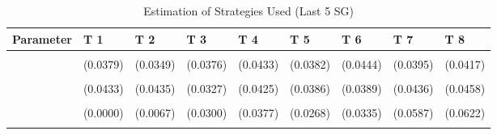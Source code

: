 \begin{table}[!h]
\centering
\caption{Estimation of Strategies Used (Last 5 SG)}
\centering
\begin{tabular}[t]{lllllllll}
\toprule
Parameter & T 1 & T 2 & T 3 & T 4 & T 5 & T 6 & T 7 & T 8\\
\midrule
\cellcolor{gray!10}{gamma} & \cellcolor{gray!10}{0.6026***} & \cellcolor{gray!10}{0.5308***} & \cellcolor{gray!10}{0.5665***} & \cellcolor{gray!10}{0.6275***} & \cellcolor{gray!10}{0.5906***} & \cellcolor{gray!10}{0.6771***} & \cellcolor{gray!10}{0.6091***} & \cellcolor{gray!10}{0.6339***}\\
 & (0.0379) & (0.0349) & (0.0376) & (0.0433) & (0.0382) & (0.0444) & (0.0395) & (0.0417)\\
\cellcolor{gray!10}{AD} & \cellcolor{gray!10}{0.4926***} & \cellcolor{gray!10}{0.3683***} & \cellcolor{gray!10}{0.8090***} & \cellcolor{gray!10}{0.6848***} & \cellcolor{gray!10}{0.7674***} & \cellcolor{gray!10}{0.7955***} & \cellcolor{gray!10}{0.3542***} & \cellcolor{gray!10}{0.3849***}\\
 & (0.0433) & (0.0435) & (0.0327) & (0.0425) & (0.0386) & (0.0389) & (0.0436) & (0.0458)\\
\cellcolor{gray!10}{AC} & \cellcolor{gray!10}{0.0000} & \cellcolor{gray!10}{0.0000} & \cellcolor{gray!10}{0.1151***} & \cellcolor{gray!10}{0.1932***} & \cellcolor{gray!10}{0.1030***} & \cellcolor{gray!10}{0.1239***} & \cellcolor{gray!10}{0.2838***} & \cellcolor{gray!10}{0.2027**}\\
\addlinespace
 & (0.0000) & (0.0067) & (0.0300) & (0.0377) & (0.0268) & (0.0335) & (0.0587) & (0.0622)\\
\cellcolor{gray!10}{G} & \cellcolor{gray!10}{0.5074***} & \cellcolor{gray!10}{0.6317***} & \cellcolor{gray!10}{0.0759**} & \cellcolor{gray!10}{0.1220***} & \cellcolor{gray!10}{0.1295***} & \cellcolor{gray!10}{0.0806**} & \cellcolor{gray!10}{0.3620***} & \cellcolor{gray!10}{0.4123***}\\
\bottomrule
\end{tabular}
\end{table}